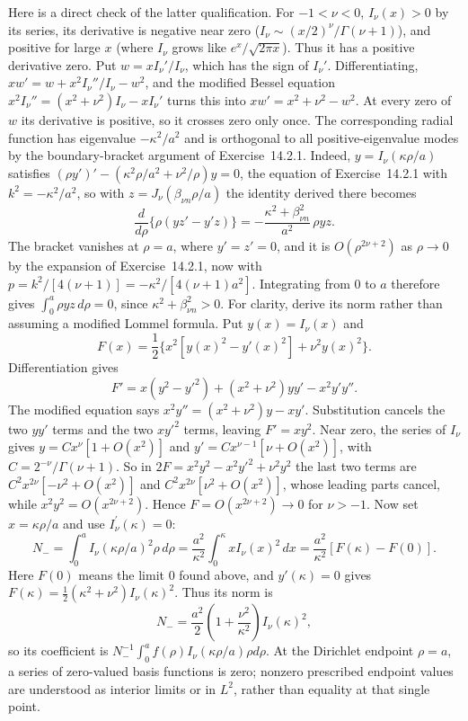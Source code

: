 Here is a direct check of the latter qualification. For $-1<\nu<0$,
$I_\nu(x)>0$ by its series, its derivative is negative near zero
($I_\nu\sim(x/2)^\nu/\Gamma(\nu+1)$), and positive for large
$x$ (where $I_\nu$ grows like $e^x/\sqrt{2\pi x}$). Thus it has a
positive derivative zero. Put $w=xI_\nu'/I_\nu$, which has the sign
of $I_\nu'$. Differentiating, $xw'=w+x^2I_\nu''/I_\nu-w^2$, and the
modified Bessel equation $x^2I_\nu''=(x^2+\nu^2)I_\nu-xI_\nu'$ turns
this into $xw'=x^2+\nu^2-w^2$. At every zero of $w$ its derivative
is positive, so it crosses zero only once. The corresponding radial
function has eigenvalue $-\kappa^2/a^2$ and is orthogonal to all
positive-eigenvalue modes by the boundary-bracket argument of
Exercise~14.2.1. Indeed, $y=I_\nu(\kappa\rho/a)$ satisfies
$(\rho y')'-(\kappa^2\rho/a^2+\nu^2/\rho)y=0$, the equation of
Exercise~14.2.1 with $k^2=-\kappa^2/a^2$, so with
$z=J_\nu(\beta_{\nu n}\rho/a)$ the identity derived there becomes
\[
\frac d{d\rho}\{\rho(yz'-y'z)\}
=-\frac{\kappa^2+\beta_{\nu n}^2}{a^2}\,\rho yz.
\]
The bracket vanishes at $\rho=a$, where $y'=z'=0$, and it is
$O(\rho^{2\nu+2})$ as $\rho\to0$ by the expansion of
Exercise~14.2.1, now with $p=k^2/[4(\nu+1)]=-\kappa^2/[4(\nu+1)a^2]$.
Integrating from $0$ to $a$ therefore gives $\int_0^a\rho yz\,d\rho=0$,
since $\kappa^2+\beta_{\nu n}^2>0$.
For clarity, derive its norm rather than assuming a modified Lommel
formula. Put $y(x)=I_\nu(x)$ and
\[
F(x)=\frac12\{x^2[y(x)^2-y'(x)^2]+\nu^2y(x)^2\}.
\]
Differentiation gives
\[
F'=x(y^2-y'^2)+(x^2+\nu^2)yy'-x^2y'y''.
\]
The modified equation says
$x^2y''=(x^2+\nu^2)y-xy'$. Substitution cancels the two
$yy'$ terms and the two $xy'^2$ terms, leaving $F'=xy^2$.
Near zero, the series of $I_\nu$ gives $y=Cx^\nu[1+O(x^2)]$ and
$y'=Cx^{\nu-1}[\nu+O(x^2)]$, with $C=2^{-\nu}/\Gamma(\nu+1)$. So in
$2F=x^2y^2-x^2y'^2+\nu^2y^2$ the last two terms are
$C^2x^{2\nu}[-\nu^2+O(x^2)]$ and $C^2x^{2\nu}[\nu^2+O(x^2)]$, whose
leading parts cancel, while $x^2y^2=O(x^{2\nu+2})$. Hence
$F=O(x^{2\nu+2})\to0$ for $\nu>-1$.
Now set $x=\kappa\rho/a$ and use $I_\nu^\prime(\kappa)=0$:
\[
N_-=\int_0^aI_\nu(\kappa\rho/a)^2\rho\,d\rho
=\frac{a^2}{\kappa^2}\int_0^\kappa xI_\nu(x)^2\,dx
=\frac{a^2}{\kappa^2}[F(\kappa)-F(0)].
\]
Here $F(0)$ means the limit $0$ found above, and $y'(\kappa)=0$ gives
$F(\kappa)=\frac12(\kappa^2+\nu^2)I_\nu(\kappa)^2$.
Thus its norm is
\[
N_-=\frac{a^2}{2}\left(1+\frac{\nu^2}{\kappa^2}\right)
I_\nu(\kappa)^2,
\]
so its coefficient is
$N_-^{-1}\int_0^a f(\rho)I_\nu(\kappa\rho/a)\rho d\rho$.
At the Dirichlet endpoint $\rho=a$, a series of zero-valued basis
functions is zero; nonzero prescribed endpoint values are understood
as interior limits or in $L^2$, rather than equality at that single
point.

